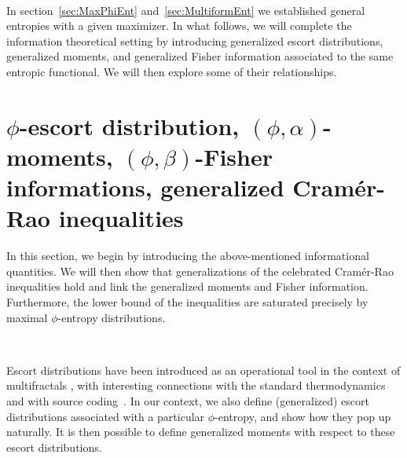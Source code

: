 \documentclass[english,sort&compress]{elsarticle}
\theoremstyle{definition}
\theoremstyle{plain}
\theoremstyle{plain}
\begin{document}
\

In section~\ref{sec:MaxPhiEnt} and~\ref{sec:MultiformEnt} we established general
entropies  with  a given  maximizer.   In what  follows,  we  will complete  the
information   theoretical    setting   by   introducing    generalized   escort
distributions,   generalized  moments,   and   generalized  Fisher   information
associated to the  same entropic functional. We will then explore some of their relationships. 



\section{$\phi$-escort           distribution,          $(\phi,\alpha)$-moments,
  $(\phi,\beta)$-Fisher informations,  generalized Cram\'er-Rao inequalities}
\label{sec:EscortCR}

In this section, we begin by introducing the above-mentioned informational quantities. 
We will then show that generalizations of the celebrated Cram\'er-Rao inequalities
hold and link the generalized moments and Fisher information. Furthermore, the lower bound of the inequalities are saturated precisely by maximal $\phi$-entropy distributions.

\

Escort distributions have been introduced as an operational tool in the context
of multifractals \cite{ChhJen89, BecSch93}, with interesting connections with
the standard thermodynamics~\cite{Nau11} and with source coding~\cite{Cam65,
 Ber09}. In our context, we also define (generalized) escort distributions
associated with a particular $\phi$-entropy, and show how they pop up naturally.
It is then possible to define generalized moments with respect to these escort
distributions.
\end{document}
